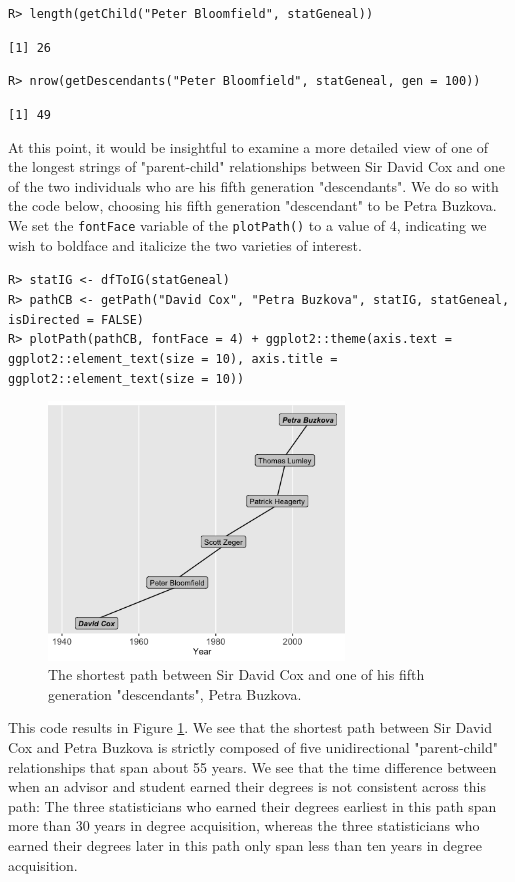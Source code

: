 \documentclass[11pt,a4paper,oldfontcommands,openany]{memoir}
\DeclareRobustCommand{\mybox}[2][gray!15]{%
\begin{tcolorbox}[   %
        breakable,
        left=0pt,
        right=0pt,
        top=0pt,
        bottom=0pt,
        colback=#1,
        colframe=#1,
        width=\dimexpr\textwidth\relax, 
        enlarge left by=0mm,
        boxsep=5pt,
        arc=0pt,outer arc=0pt,
        ]
        #2
\end{tcolorbox}
}
\numberwithin{equation}{section} %
\newcommand{\code}[1]{{\texttt{#1}}}
\begin{document}
\mybox{
\texttt{R> length(getChild("Peter Bloomfield", statGeneal))}
}

\mybox[green!10]{
\texttt{[1] 26}
}

\mybox{
\texttt{R> nrow(getDescendants("Peter Bloomfield", statGeneal, gen = 100))}
}

\mybox[green!10]{
\texttt{[1] 49}
}

At this point, it would be insightful to examine a more detailed view of one of the longest strings of "parent-child" relationships between Sir David Cox and one of the two individuals who are his fifth generation "descendants". We do so with the code below, choosing his fifth generation "descendant" to be Petra Buzkova. We set the \code{fontFace} variable of the \code{plotPath()} to a value of 4, indicating we wish to boldface and italicize the two varieties of interest.

\mybox{
\texttt{R> statIG <- dfToIG(statGeneal)}\\
\texttt{R> pathCB <- getPath("David Cox", "Petra Buzkova", statIG, statGeneal, isDirected = FALSE)}\\
\texttt{R> plotPath(pathCB, fontFace = 4) + ggplot2::theme(axis.text = ggplot2::element\_text(size = 10), axis.title = ggplot2::element\_text(size = 10))}
}

\begin{figure}[H]
    \begin{framed}
    \centering
    \includegraphics[width=0.7\textwidth]{pathCB}
    \end{framed}
    \caption{The shortest path between Sir David Cox and one of his fifth generation "descendants", Petra Buzkova.}
    \label{fig:pathCB}
\end{figure}

This code results in Figure \ref{fig:pathCB}. We see that the shortest path between Sir David Cox and Petra Buzkova is strictly composed of five unidirectional "parent-child" relationships that span about 55 years. We see that the time difference between when an advisor and student earned their degrees is not consistent across this path: The three statisticians who earned their degrees earliest in this path span more than 30 years in degree acquisition, whereas the three statisticians who earned their degrees later in this path only span less than ten years in degree acquisition.
\end{document}
